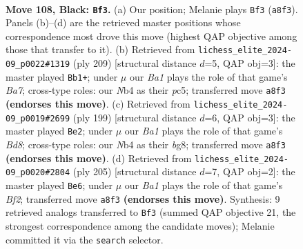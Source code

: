 \documentclass[11pt]{article}
\begin{document}
\clearpage

\begin{figure}[p]\centering
\begin{subfigure}{0.46\textwidth}\centering
\resizebox{\linewidth}{!}{%
\newchessgame
\chessboard[
  setfen={b7/8/8/8/1n1B3k/8/5P2/6K1 b - - 62 108},
  showmover=false,
  pgfstyle=straightmove, color=movearrow, markmove={a8-f3}
]}
\caption{}
\end{subfigure}\hfill
\begin{subfigure}{0.46\textwidth}\centering
\resizebox{\linewidth}{!}{%
\newchessgame
\chessboard[
  setfen={4k3/8/2p2PK1/2P5/8/2B5/b7/8 b - - 20 105},
  showmover=false,
  pgfstyle=straightmove, color=movearrow, markmove={a2-b1}
]}
\caption{}
\end{subfigure}
\\[4pt]
\begin{subfigure}{0.46\textwidth}\centering
\resizebox{\linewidth}{!}{%
\newchessgame
\chessboard[
  setfen={6B1/8/8/8/3k4/P7/1K6/3b4 b - - 22 100},
  showmover=false,
  pgfstyle=straightmove, color=movearrow, markmove={d1-e2}
]}
\caption{}
\end{subfigure}\hfill
\begin{subfigure}{0.46\textwidth}\centering
\resizebox{\linewidth}{!}{%
\newchessgame
\chessboard[
  setfen={8/5b2/5P2/8/3B4/8/3k4/1K6 b - - 20 103},
  showmover=false,
  pgfstyle=straightmove, color=movearrow, markmove={f7-e6}
]}
\caption{}
\end{subfigure}
\caption{\textbf{Move 108, Black: \texttt{Bf3}.} (a) Our position; Melanie plays \texttt{Bf3} (\texttt{a8f3}). Panels (b)--(d) are the retrieved master positions whose correspondence most drove this move (highest QAP objective among those that transfer to it). (b) Retrieved from \texttt{lichess\_elite\_2024-09\_p0022\#1319} (ply 209) [structural distance $d$=5, QAP obj=3]: the master played \texttt{Bb1+}; under $\mu$ our \emph{Ba1} plays the role of that game's \emph{Ba7}; cross-type roles: our \emph{N}b4 as their \emph{p}c5; transferred move \texttt{a8f3} \textbf{(endorses this move)}. (c) Retrieved from \texttt{lichess\_elite\_2024-09\_p0019\#2699} (ply 199) [structural distance $d$=6, QAP obj=3]: the master played \texttt{Be2}; under $\mu$ our \emph{Ba1} plays the role of that game's \emph{Bd8}; cross-type roles: our \emph{N}b4 as their \emph{b}g8; transferred move \texttt{a8f3} \textbf{(endorses this move)}. (d) Retrieved from \texttt{lichess\_elite\_2024-09\_p0020\#2804} (ply 205) [structural distance $d$=7, QAP obj=2]: the master played \texttt{Be6}; under $\mu$ our \emph{Ba1} plays the role of that game's \emph{Bf2}; transferred move \texttt{a8f3} \textbf{(endorses this move)}. Synthesis: 9 retrieved analogs transferred to \texttt{Bf3} (summed QAP objective 21, the strongest correspondence among the candidate moves); Melanie committed it via the \texttt{search} selector.}
\label{fig:thought-m215}
\end{figure}
\end{document}

